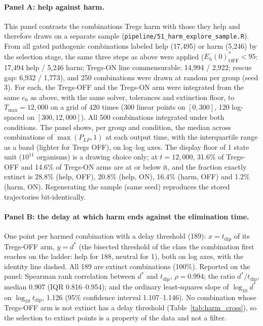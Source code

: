 \documentclass[11pt]{article}
\begin{document}
\paragraph{Panel A: help against harm.}
This panel contrasts the combinations Tregs harm with those they help and
therefore draws on a separate sample (\texttt{pipeline/51\_harm\_explore\_sample.R}).
From all gated pathogenic combinations labeled help (17,495) or harm (5,246) by
the selection stage, the same three steps as above were applied
($E_h(0)^*_{\mathrm{OFF}}<95$: 17,494 help / 5,246 harm; Tregs-ON line
commensurable: 14,994 / 2,922; rescue gap: 6,932 / 1,773), and 250 combinations were
drawn at random per group (seed 3). For each, the Tregs-OFF and the Tregs-ON arm
were integrated from the same $e_0$ as above, with the same solver, tolerances
and extinction floor, to $T_{\max}=12{,}000$ on a grid of 420 times (300 linear
points on $[0,300]$, 120 log-spaced on $[300, 12{,}000]$). All 500 combinations
integrated under both conditions. The panel shows, per group and condition, the
median across combinations of $\max(P_{LP},1)$ at each output time, with the
interquartile range as a band (lighter for Tregs OFF), on log--log axes. The
display floor of 1 state unit ($10^{11}$ organisms) is a drawing choice only; at
$t=12{,}000$, 31.6\% of Tregs-OFF and 14.6\% of Tregs-ON arms are at or below
it, and the fraction exactly extinct is 28.8\% (help, OFF), 20.8\% (help, ON),
16.4\% (harm, OFF) and 1.2\% (harm, ON). Regenerating the sample (same seed) reproduces
the stored trajectories bit-identically.

\paragraph{Panel B: the delay at which harm ends against the elimination time.}
One point per harmed combination with a delay threshold (189): $x=t_{\mathrm{dip}}$
of its Tregs-OFF arm, $y=d^\ast$ (the bisected threshold of the class the
combination first reaches on the ladder: help for 188, neutral for 1), both on
log axes, with the identity line dashed. All 189 are extinct combinations
(100\%). Reported on the panel: Spearman rank correlation between $d^\ast$ and
$t_{\mathrm{dip}}$, $\rho=0.994$; the ratio $d^\ast/t_{\mathrm{dip}}$, median
0.907 (IQR 0.816--0.954); and the ordinary least-squares slope of
$\log_{10}d^\ast$ on $\log_{10}t_{\mathrm{dip}}$, 1.126 (95\% confidence interval
1.107--1.146). No combination whose Tregs-OFF arm is not extinct has a delay
threshold (Table~\ref{tab:harm_cross}), so the selection to extinct points is a
property of the data and not a filter.
\end{document}

